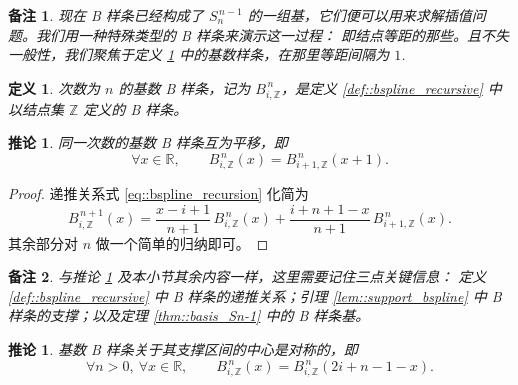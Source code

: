\documentclass[a4paper]{ctexart}
\newtheorem{remark}{备注}
\newtheorem{definition}[theorem]{定义} %
\newtheorem{corollary}[theorem]{推论}
\numberwithin{theorem}{section}
\numberwithin{equation}{section}
\numberwithin{figure}{section}
\numberwithin{remark}{section}
\begin{document}
\begin{remark}
    \label{rem::cardinal_intro}
现在 B 样条已经构成了 $S^{\,n-1}_n$ 的一组基，它们便可以用来求解插值问题。我们用一种特殊类型的 B 样条来演示这一过程：
即结点等距的那些。且不失一般性，我们聚焦于定义 \ref{def::cardinal_bspline} 中的基数样条，在那里等距间隔为 $1$.
\end{remark}

\begin{definition}
    \label{def::cardinal_bspline}
次数为 $n$ 的基数 B 样条，记为 $B^{\,n}_{i,\mathbb{Z}}$，是定义 \ref{def::bspline_recursive} 中以结点集 $\mathbb{Z}$ 定义的 B 样条。
\end{definition}

\begin{corollary}
    \label{cor::cardinal_translate}
同一次数的基数 B 样条互为平移，即
\begin{equation}
\label{eq::cardinal_translate}
\forall x\in\mathbb{R},\qquad
B^{\,n}_{i,\mathbb{Z}}(x)=B^{\,n}_{i+1,\mathbb{Z}}(x+1).
\end{equation}

\end{corollary}

\begin{proof}
递推关系式 \eqref{eq::bspline_recursion} 化简为
\begin{equation}
\label{eq::cardinal_bspline_recursion}
B^{\,n+1}_{i,\mathbb{Z}}(x)
=\frac{x-i+1}{n+1}\,B^{\,n}_{i,\mathbb{Z}}(x)
+\frac{i+n+1-x}{n+1}\,B^{\,n}_{i+1,\mathbb{Z}}(x).
\end{equation}
其余部分对 $n$ 做一个简单的归纳即可。 
\end{proof}

\begin{remark}
    \label{rem::cardinal_keys}
与推论 \ref{cor::cardinal_translate} 及本小节其余内容一样，这里需要记住三点关键信息：
定义 \ref{def::bspline_recursive} 中 B 样条的递推关系；引理 \ref{lem::support_bspline} 中 B 样条的支撑；以及定理 \ref{thm::basis_Sn-1} 中的 B 样条基。
\end{remark}

\begin{corollary}
    \label{cor::cardinal_symmetry}
基数 B 样条关于其支撑区间的中心是对称的，即
\begin{equation}
\label{eq::cardinal_symmetry}    
\forall n>0,\ \forall x\in\mathbb{R},\qquad
B^{\,n}_{i,\mathbb{Z}}(x)=B^{\,n}_{i,\mathbb{Z}}(2i+n-1-x).
\end{equation}
\end{corollary}
\end{document}
